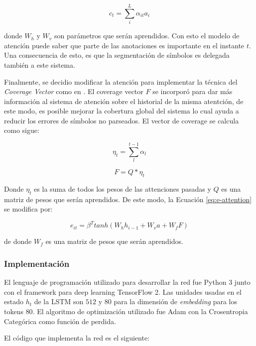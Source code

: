 \begin{equation}
    c_{t} = \sum_{i} ^ {L} \alpha_{it}a_{i}
\end{equation}

donde $W_{h}$ y $W_{v}$ son parámetros que serán aprendidos. Con esto el modelo de atención puede saber que parte de las anotaciones es importante en el instante $t$. Una consecuencia de esto, es que la segmentación de símbolos es delegada también a este sistema.

Finalmente, se decidio modificar la atención para implementar la técnica del \textit{Coverage Vector} como en \cite{chino}. El coverage vector $F$ se incorporó para dar más información al sistema de atención sobre el historial de la misma atentción, de este modo, es posible mejorar la cobertura global del sistema lo cual ayuda a reducir los errores de símbolos no parseados. El vector de coverage se calcula como sigue:

\begin{equation}
    \eta_{t} = \sum_{l}^{t-1} \alpha_{l}
\end{equation}

\begin{equation}
    F = Q * \eta_{t}
    \label{eq:coverage-vector}
\end{equation}

Donde $\eta_{t}$ es la suma de todos los pesos de las attenciones pasadas y $Q$ es una matriz de pesos que serán aprendidos. De este modo, la Ecuación \ref{eq:e-attention} se modifica por:

\begin{equation}
    e_{it} = \beta ^ {T} tanh(W_{h}h_{i-1} + W_{v}a + W_{f}F)
\end{equation}

de donde $W_{f}$ es una matriz de pesos que serán aprendidos.

\subsubsection{Implementación}

El lenguaje de programación utilizado para desarrollar la red fue Python 3 junto con el framework para deep learning TensorFlow 2. Las unidades usadas en el estado $h_{t}$ de la LSTM son $512$ y $80$ para la dimensión de \textit{embedding} para los tokens $80$. El algoritmo de optimización utilizado fue Adam con la Crosentropia Categórica como función de perdida. 

El código que implementa la red es el siguiente:

